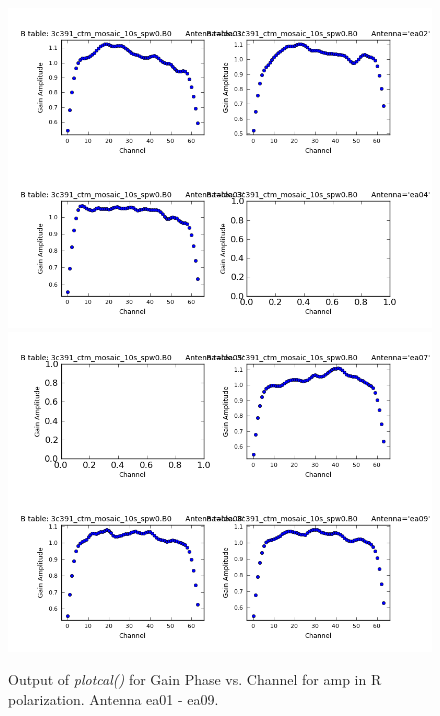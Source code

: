 \documentclass[12pt, a4paper]{article}
\begin{document}
\begin{figure}[h!]
\centering
\includegraphics[scale=0.65]{../Imaging/plots2/part4-subE-question3a_amp_pol-R-ea01-ea04.png}
\includegraphics[scale=0.65]{../Imaging/plots2/part4-subE-question3a_amp_pol-R-ea05-ea09.png}
\caption{Output of \emph{plotcal()} for Gain Phase vs. Channel for amp in R polarization. Antenna ea01 - ea09.}
\end{figure}
\addtocounter{figure}{-1}
\end{document}
